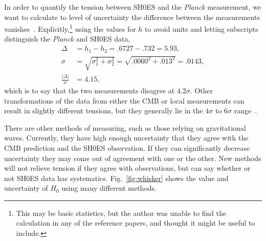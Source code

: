 \documentclass[12pt]{article}
\newcommand{\Planck}[1]{\textit{Planck}}
\newcommand{\nn}{\nonumber\\}
\begin{document}
In order to quantify the tension between SH0ES and the \Planck{} measurement, we want to calculate to level of uncertainty the difference between the measurements vanishes~\cite{Dietrich2014}. Explicitly,\footnote{This may be basic statistics, but the author was unable to find the calculation in any of the reference papers, and thought it might be useful to include.} using the values for $h$ to avoid units and letting subscripts distinguish the \Planck{} and SH0ES data, 
\begin{align}
\Delta &= h_1 - h_2 = .6727 - .732 = 5.93,\nn
\sigma &= \sqrt{\sigma_1^2 + \sigma_2^2} = \sqrt{.0060^2 + .013^2} = .0143,\nn
\frac{|\Delta|}{\sigma} &= 4.15,
\end{align}
which is to say that the two measurements disagree at $4.2\sigma$. Other transformations of the data from either the CMB or local measurements can result in slightly different tensions, but they generally lie in the $4\sigma$ to $6\sigma$ range~\cite{DiValentino2021}.

There are other methods of measuring, such as those relying on gravitational waves. Currently, they have high enough uncertainty that they agree with the CMB prediction and the SH0ES observation. If they can significantly decrease uncertainty they may come out of agreement with one or the other. New methods
will not relieve tension if they agree with observations, but can say whether or not SH0ES data has  systematics.
Fig.~\ref{fig:whisker} shows the value and uncertainty of $H_0$ using many different methods. 
\end{document}
